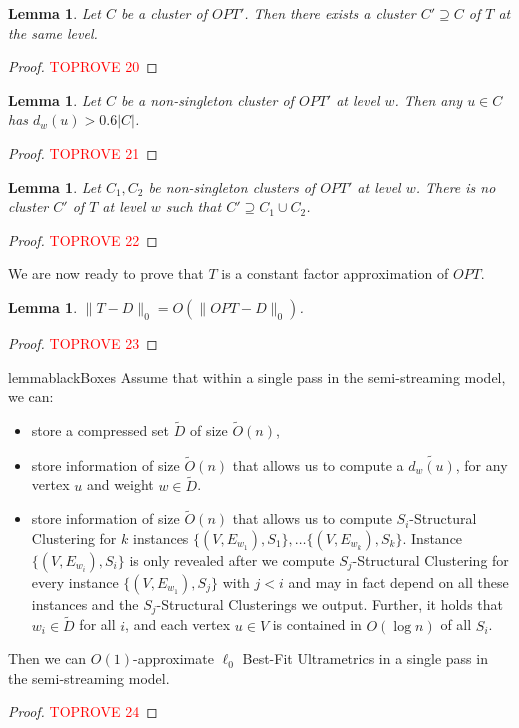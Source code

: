 \documentclass{article}
\newtheorem{lemma}[theorem]{Lemma}
\newcommand{\lo}{$\ell_0$ Best-Fit Ultrametrics}
\newcommand{\set}[1]{\{#1\}}
\begin{document}
\begin{lemma} \label{lem:inclusion}
Let $C$ be a cluster of $OPT'$. Then there exists a cluster $C' \supseteq C$ of $T$ at the same level.
\end{lemma}
\begin{proof}\textcolor{red}{TOPROVE 20}\end{proof}

\begin{lemma} \label{lem:Tdense}
Let $C$ be a non-singleton cluster of $OPT'$ at level $w$.
Then any $u\in C$ has $d_w(u) > 0.6|C|$.
\end{lemma}
\begin{proof}\textcolor{red}{TOPROVE 21}\end{proof}

\begin{lemma} \label{lem:no2inside}
Let $C_1, C_2$ be non-singleton clusters of $OPT'$ at level $w$. There is no cluster $C'$ of $T$ at level $w$ such that $C'\supseteq C_1\cup C_2$.
\end{lemma}
\begin{proof}\textcolor{red}{TOPROVE 22}\end{proof}

We are now ready to prove that $T$ is a constant factor approximation of $OPT$.
\begin{lemma}
$\|T-D\|_0 = O(\|OPT-D\|_0)$.
\end{lemma}
\begin{proof}\textcolor{red}{TOPROVE 23}\end{proof}

\begin{restatable}{lemma}{blackBoxes}\label{lem:blackBoxes}
Assume that within a single pass in the semi-streaming model, we can:
\begin{itemize}
    \item store a compressed set $\widetilde{D}$ of size $\widetilde{O}(n)$,
    \item store information of size $\widetilde{O}(n)$ that allows us to compute a $\widetilde{d_w(u)}$, for any vertex $u$ and weight $w\in \widetilde{D}$.
    \item store information of size $\widetilde{O}(n)$ that allows us to compute $S_i$-Structural Clustering for $k$ instances $\set{(V, E_{w_1}),S_1}, \ldots \set{(V, E_{w_k}), S_k}$.
    Instance $\set{(V, E_{w_i}),S_i}$ is only revealed after we compute $S_j$-Structural Clustering for every instance $\set{(V, E_{w_1}),S_j}$ with $j<i$ and may in fact depend on all these instances and the $S_j$-Structural Clusterings we output.
    Further, it holds that $w_i\in \widetilde{D}$ for all $i$, and each vertex $u\in V$ is contained in $O(\log{n})$ of all $S_i$.
\end{itemize}
Then we can $O(1)$-approximate \lo{} in a single pass in the semi-streaming model.
\end{restatable}
\begin{proof}\textcolor{red}{TOPROVE 24}\end{proof}
\end{document}
